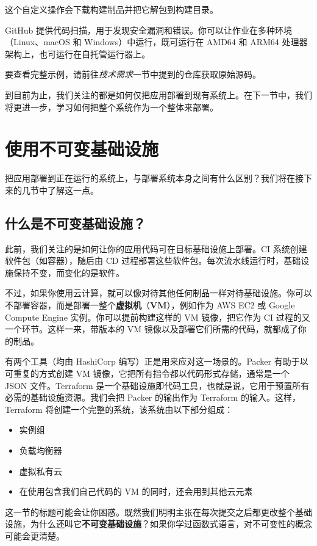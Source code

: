 这个自定义操作会下载构建制品并把它解包到构建目录。

\label{idx:967}
GitHub 提供代码扫描，用于发现安全漏洞和错误。你可以让作业在多种环境（Linux、macOS 和 Windows）中运行，既可运行在 AMD64 和 ARM64 处理器架构上，也可运行在自托管运行器上。

要查看完整示例，请前往\emph{技术需求}一节中提到的仓库获取原始源码。

到目前为止，我们关注的都是如何仅把应用部署到现有系统上。在下一节中，我们将更进一步，学习如何把整个系统作为一个整体来部署。

\section{使用不可变基础设施}

把应用部署到正在运行的系统上，与部署系统本身之间有什么区别？我们将在接下来的几节中了解这一点。

\subsection{什么是不可变基础设施？}

\label{idx:968}
此前，我们关注的是如何让你的应用代码可在目标基础设施上部署。CI 系统创建软件包（如容器），随后由 CD 过程部署这些软件包。每次流水线运行时，基础设施保持不变，而变化的是软件。

\label{idx:969}
不过，如果你使用云计算，就可以像对待其他任何制品一样对待基础设施。你可以不部署容器，而是部署一整个\textbf{虚拟机}（\textbf{VM}），例如作为 AWS EC2 或 Google Compute Engine 实例。你可以提前构建这样的 VM 镜像，把它作为 CI 过程的又一个环节。这样一来，带版本的 VM 镜像以及部署它们所需的代码，就都成了你的制品。

有两个工具（均由 HashiCorp 编写）正是用来应对这一场景的。Packer 有助于以可重复的方式创建 VM 镜像，它把所有指令都以代码形式存储，通常是一个 JSON 文件。Terraform 是一个基础设施即代码工具，也就是说，它用于预置所有必需的基础设施资源。我们会把 Packer 的输出作为 Terraform 的输入。这样，Terraform 将创建一个完整的系统，该系统由以下部分组成：

\begin{itemize}
\item 实例组
\item 负载均衡器
\item 虚拟私有云
\item 在使用包含我们自己代码的 VM 的同时，还会用到其他云元素
\end{itemize}

这一节的标题可能会让你困惑。既然我们明明主张在每次提交之后都更改整个基础设施，为什么还叫它\textbf{不可变基础设施}？如果你学过函数式语言，对不可变性的概念可能会更清楚。

